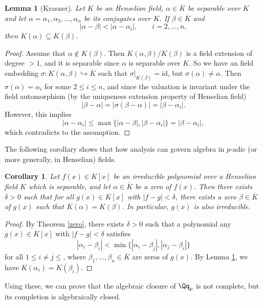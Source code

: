 \documentclass{article}
\newtheorem{lemma}{Lemma}
\newtheorem{corollary}{Corollary}
\begin{document}
\begin{lemma}[Krasner]
\label{kr}
Let $K$ be an Henselian field, $\alpha\in \overline{K}$ be separable over $K$ and let $\alpha = \alpha_1, \alpha_2, \dots, \alpha_n$ be its conjugates over $K$. If $\beta\in \overline{K}$ and 
$$
|\alpha - \beta| < |\alpha - \alpha_i|, \qquad i = 2, \dots, n, 
$$
then $K(\alpha)\subseteq K(\beta)$. 
\end{lemma}
\begin{proof}
Assume that $\alpha\not\in K(\beta)$. 
Then $K(\alpha, \beta)/K(\beta)$ is a field extension of degree $>1$, and it is separable since $\alpha$ is separable over $K$. 
So we have an field embedding $\sigma:K(\alpha, \beta)\hookrightarrow \overline{K}$ such that $\sigma|_{K(\beta)} = \mathrm{id}$, but $\sigma(\alpha) \neq \alpha$. Then $\sigma(\alpha) = \alpha_i$ for some $2\leq i\leq n$, and since the valuation is invariant under the field automorphism (by the uniqueness extension property of Henselian field)
$$
|\beta - \alpha| = |\sigma(\beta -\alpha)| = |\beta - \alpha_i|.
$$
However, this implies
$$
|\alpha - \alpha_i| \leq \max\{ |\alpha- \beta|, |\beta - \alpha_i|\} = |\beta - \alpha_i|, 
$$
which contradicts to the assumption. 
\end{proof}
The following corollary shows that how analysis can govern algebra in $p$-adic (or more generally, in Henselian) fields. 
\begin{corollary}
Let $f(x)\in K[x]$ be an irreducible polynomial over a Henselian field $K$ which is separable, and let $\alpha\in \overline{K}$ be a zero of $f(x)$. 
Then there exists $\delta >0$ such that for all $g(x)\in K[x]$ with $|f-g| <\delta$, there exists a zero $\beta\in \overline{K}$ of $g(x)$ such that $K(\alpha) = K(\beta)$. 
In particular, $g(x)$ is also irreducible. 
\end{corollary}
\begin{proof}
By Theorem \ref{zero}, there exists $\delta >0$ such that a  polynomial any $g(x) \in K[x]$ with $|f - g| < \delta$ satisfies 
$$
|\alpha_{i} - \beta_{i}| < \min\{ |\alpha_{i} - \beta_{j}|, |\alpha_{j} - \beta_{i}|\}
$$
for all $1\leq i\neq j\leq $, where $\beta_{1}, \dots, \beta_{n} \in \overline{K}$ are zeros of $g(x)$. 
By Lemma \ref{kr}, we have $K(\alpha_i) = K(\beta_i)$.  
\end{proof}

Using these, we can prove that the algebraic closure of $\Qq_{p}$ is not complete, but its completion is algebraically closed. 
\end{document}
